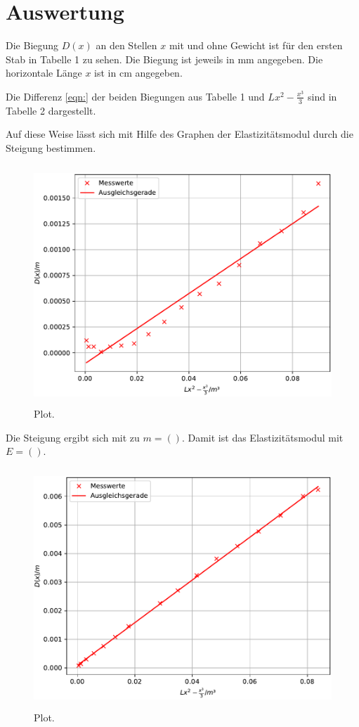 \section{Auswertung}
\label{sec:Auswertung}

Die Biegung $D(x)$ an den Stellen $x$ mit und ohne Gewicht
ist für den ersten Stab in Tabelle 1 zu sehen. Die Biegung ist %
jeweils in $\si{\mm}$ angegeben.
Die horizontale Länge $x$ ist in $\si{\cm}$ angegeben.


Die Differenz \eqref{eqn:} der beiden Biegungen aus Tabelle 1 %
und $Lx^2-\frac{x^3}{3}$ sind in Tabelle 2 dargestellt. %


Auf diese Weise lässt sich mit Hilfe des Graphen %
der Elastizitätsmodul durch die Steigung bestimmen. %
\begin{figure}
  \centering
  \includegraphics[width=12cm, height=9cm]{./plots/Stange1.pdf}
  \caption{Plot.}
  \label{fig:plot}
\end{figure}
Die Steigung ergibt sich mit %
zu $m =()$. Damit ist das Elastizitätsmodul mit %
$E = ()$.





\begin{figure}
  \centering
  \includegraphics[width=12cm, height=9cm]{./plots/Stange2.pdf}
  \caption{Plot.}
  \label{fig:plot}
\end{figure}

